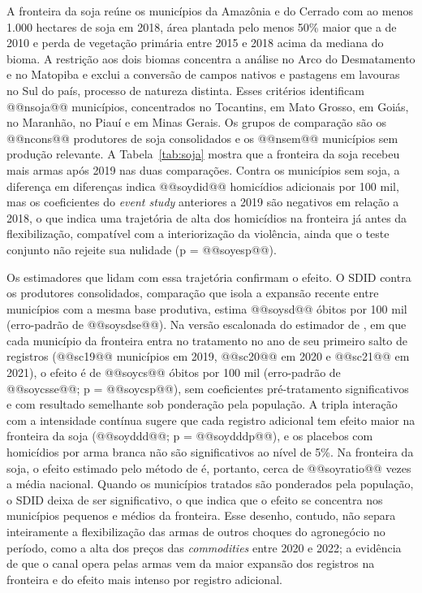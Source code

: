 \documentclass[11pt,a4paper]{article}
\begin{document}
A fronteira da soja reúne os municípios da Amazônia e do Cerrado com ao menos 1.000 hectares de soja em 2018, área plantada pelo menos 50\% maior que a de 2010 e perda de vegetação primária entre 2015 e 2018 acima da mediana do bioma. A restrição aos dois biomas concentra a análise no Arco do Desmatamento e no Matopiba e exclui a conversão de campos nativos e pastagens em lavouras no Sul do país, processo de natureza distinta. Esses critérios identificam @@nsoja@@ municípios, concentrados no Tocantins, em Mato Grosso, em Goiás, no Maranhão, no Piauí e em Minas Gerais. Os grupos de comparação são os @@ncons@@ produtores de soja consolidados e os @@nsem@@ municípios sem produção relevante. A Tabela~\ref{tab:soja} mostra que a fronteira da soja recebeu mais armas após 2019 nas duas comparações. Contra os municípios sem soja, a diferença em diferenças indica @@soydid@@ homicídios adicionais por 100 mil, mas os coeficientes do \textit{event study} anteriores a 2019 são negativos em relação a 2018, o que indica uma trajetória de alta dos homicídios na fronteira já antes da flexibilização, compatível com a interiorização da violência, ainda que o teste conjunto não rejeite sua nulidade (p = @@soyesp@@).

Os estimadores que lidam com essa trajetória confirmam o efeito. O SDID contra os produtores consolidados, comparação que isola a expansão recente entre municípios com a mesma base produtiva, estima @@soysd@@ óbitos por 100 mil (erro-padrão de @@soysdse@@). Na versão escalonada do estimador de \citet{callaway2021}, em que cada município da fronteira entra no tratamento no ano de seu primeiro salto de registros (@@sc19@@ municípios em 2019, @@sc20@@ em 2020 e @@sc21@@ em 2021), o efeito é de @@soycs@@ óbitos por 100 mil (erro-padrão de @@soycsse@@; p = @@soycsp@@), sem coeficientes pré-tratamento significativos e com resultado semelhante sob ponderação pela população. A tripla interação com a intensidade contínua sugere que cada registro adicional tem efeito maior na fronteira da soja (@@soyddd@@; p = @@soydddp@@), e os placebos com homicídios por arma branca não são significativos ao nível de 5\%. Na fronteira da soja, o efeito estimado pelo método de \citet{callaway2021} é, portanto, cerca de @@soyratio@@ vezes a média nacional. Quando os municípios tratados são ponderados pela população, o SDID deixa de ser significativo, o que indica que o efeito se concentra nos municípios pequenos e médios da fronteira. Esse desenho, contudo, não separa inteiramente a flexibilização das armas de outros choques do agronegócio no período, como a alta dos preços das \textit{commodities} entre 2020 e 2022; a evidência de que o canal opera pelas armas vem da maior expansão dos registros na fronteira e do efeito mais intenso por registro adicional.
\end{document}
